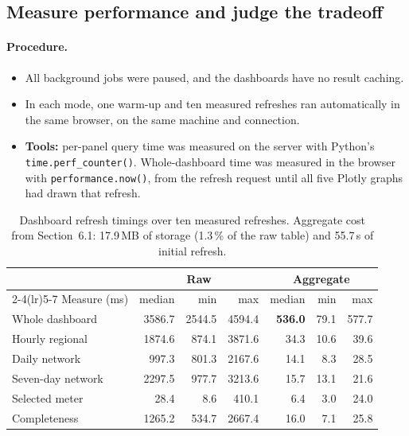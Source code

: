 \documentclass[11pt,a4paper]{article}
\begin{document}
\subsection{Measure performance and judge the tradeoff}

\paragraph{Procedure.}
\begin{itemize}
\item All background jobs were paused, and the dashboards have no result caching.
\item In each mode, one warm-up and ten measured refreshes ran automatically in the
same browser, on the same machine and connection.
\item \textbf{Tools:} per-panel query time was measured on the server with Python's
\texttt{time.perf\_counter()}. Whole-dashboard time was measured in the browser with
\texttt{performance.now()}, from the refresh request until all five Plotly graphs had
drawn that refresh.
\end{itemize}

\begin{table}[H]\centering\small
\begin{tabular}{lrrrrrr}\toprule
 & \multicolumn{3}{c}{Raw} & \multicolumn{3}{c}{Aggregate}\\
\cmidrule(lr){2-4}\cmidrule(lr){5-7}
Measure (ms) & median & min & max & median & min & max\\\midrule
Whole dashboard & 3586.7 & 2544.5 & 4594.4 & \textbf{536.0} & 79.1 & 577.7\\
Hourly regional & 1874.6 & 874.1 & 3871.6 & 34.3 & 10.6 & 39.6\\
Daily network & 997.3 & 801.3 & 2167.6 & 14.1 & 8.3 & 28.5\\
Seven-day network & 2297.5 & 977.7 & 3213.6 & 15.7 & 13.1 & 21.6\\
Selected meter & 28.4 & 8.6 & 410.1 & 6.4 & 3.0 & 24.0\\
Completeness & 1265.2 & 534.7 & 2667.4 & 16.0 & 7.1 & 25.8\\\bottomrule
\end{tabular}
\caption{Dashboard refresh timings over ten measured refreshes. Aggregate cost from
Section~6.1: 17.9\,MB of storage (1.3\,\% of the raw table) and 55.7\,s of initial
refresh.}
\end{table}
\end{document}
